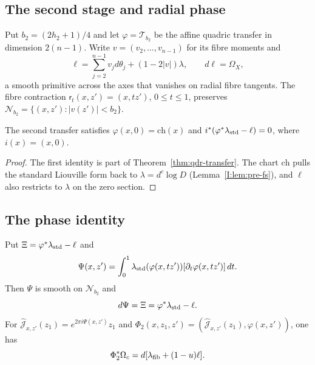 \subsection{The second stage and radial phase}\label{sec:two-second}

Put $b_2=(2h_2+1)/4$ and let $\varphi=\mathcal T_{b_2}$ be the affine quadric transfer in dimension $2(n-1)$.
Write $v=(v_2,\dots,v_{n-1})$ for its fibre moments and
\[
 \ell=\sum_{j=2}^{n-1}v_jd\theta_j+(1-2|v|)\lambda,\qquad d\ell=\Omega_X,
\]
a smooth primitive across the axes that vanishes on radial fibre tangents. The fibre contraction $\mathsf r_t(x,z')=(x,tz')$, $0\le t\le1$, preserves $\mathcal N_{b_2}=\{(x,z'):|v(z')|<b_2\}$.

\begin{lemma}\label{lem:two-zero-fixed}
The second transfer satisfies $\varphi(x,0)=\mathrm{ch}(x)$ and $i^*(\varphi^*\lambda_{\rm std}-\ell)=0$, where $i(x)=(x,0)$.
\end{lemma}

\begin{proof}
The first identity is part of Theorem~\ref{thm:qdr-transfer}. The chart $\mathrm{ch}$ pulls the standard Liouville form back
to $\lambda=d^c\log D$ (Lemma~\ref{I:lem:pre-fs}), and $\ell$ also restricts to $\lambda$ on the zero section.
\end{proof}

\subsection{The phase identity}\label{sec:two-identification}

\begin{lemma}\label{lem:two-identification}
Put $\Xi=\varphi^*\lambda_{\rm std}-\ell$ and
\[
 \Psi(x,z')=\int_0^1\lambda_{\rm std}(\varphi(x,tz'))[\partial_t\varphi(x,tz')]\,dt.
\]
Then $\Psi$ is smooth on $\mathcal N_{b_2}$ and
\begin{equation}\label{eq:two-homotopy}
 d\Psi=\Xi=\varphi^*\lambda_{\rm std}-\ell.
\end{equation}
For $\hat{\mathcal J}_{x,z'}(z_1)=e^{2\pi i\Psi(x,z')}z_1$ and
$\Phi_2(x,z_1,z')=(\hat{\mathcal J}_{x,z'}(z_1),\varphi(x,z'))$, one has
\begin{equation}\label{eq:two-Phi2}
 \Phi_2^*\Omega_c=d[\lambda_{\rm fib}+(1-u)\ell].
\end{equation}
\end{lemma}

